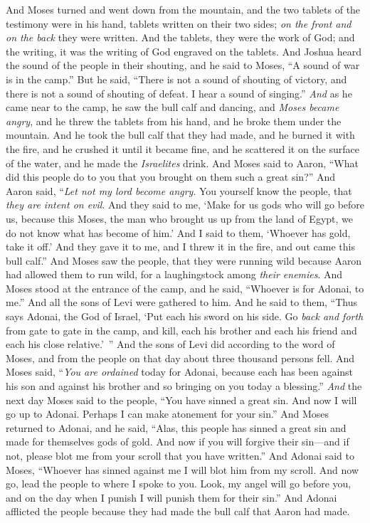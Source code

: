 \begin{biblechapter}
\verse And Moses turned and went down from the mountain, and the two tablets of the testimony were in his hand, tablets written on their two sides; \textit{on the front and on the back} they were written.
\verse And the tablets, they were the work of God; and the writing, it was the writing of God engraved on the tablets.
\verse And Joshua heard the sound of the people in their shouting, and he said to Moses, “A sound of war is in the camp.”
\verse But he said, “There is not a sound of shouting of victory, and there is not a sound of shouting of defeat. I hear a sound of singing.”
\verse \textit{And} as he came near to the camp, he saw the bull calf and dancing, and \textit{Moses became angry}, and he threw the tablets from his hand, and he broke them under the mountain.
\verse And he took the bull calf that they had made, and he burned it with the fire, and he crushed it until it became fine, and he scattered it on the surface of the water, and he made the \textit{Israelites} drink.
\verse And Moses said to Aaron, “What did this people do to you that you brought on them such a great sin?”
\verse And Aaron said, “\textit{Let not my lord become angry}. You yourself know the people, that \textit{they are intent on evil}.
\verse And they said to me, ‘Make for us gods who will go before us, because this Moses, the man who brought us up from the land of Egypt, we do not know what has become of him.’
\verse And I said to them, ‘Whoever has gold, take it off.’ And they gave it to me, and I threw it in the fire, and out came this bull calf.”
\verse And Moses saw the people, that they were running wild because Aaron had allowed them to run wild, for a laughingstock among \textit{their enemies}.
\verse And Moses stood at the entrance of the camp, and he said, “Whoever is for Adonai, to me.” And all the sons of Levi were gathered to him.
\verse And he said to them, “Thus says Adonai, the God of Israel, ‘Put each his sword on his side. Go \textit{back and forth} from gate to gate in the camp, and kill, each his brother and each his friend and each his close relative.’ ”
\verse And the sons of Levi did according to the word of Moses, and from the people on that day about three thousand persons fell.
\verse And Moses said, “\textit{You are ordained} today for Adonai, because each has been against his son and against his brother and so bringing on you today a blessing.”
\verse \textit{And} the next day Moses said to the people, “You have sinned a great sin. And now I will go up to Adonai. Perhaps I can make atonement for your sin.”
\verse And Moses returned to Adonai, and he said, “Alas, this people has sinned a great sin and made for themselves gods of gold.
\verse And now if you will forgive their sin—and if not, please blot me from your scroll that you have written.”
\verse And Adonai said to Moses, “Whoever has sinned against me I will blot him from my scroll.
\verse And now go, lead the people to where I spoke to you. Look, my angel will go before you, and on the day when I punish I will punish them for their sin.”
\verse And Adonai afflicted the people because they had made the bull calf that Aaron had made.
\end{biblechapter}

